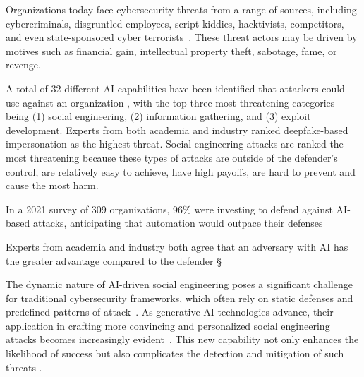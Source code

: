 






%
%
Organizations today face cybersecurity threats from a range of sources, including cybercriminals, disgruntled employees, script kiddies, hacktivists, competitors, and even state-sponsored cyber terrorists~\citep{mirsky_Threat_Offensive_AI_Organizations_2023}. These threat actors may be driven by motives such as financial gain, intellectual property theft, sabotage, fame, or revenge.








%
%
A total of 32 different AI capabilities have been identified that attackers could use against an organization \citep{mirsky_Threat_Offensive_AI_Organizations_2023}, with the top three most threatening categories being (1) social engineering, (2) information gathering, and (3) exploit development. Experts from both academia and industry ranked deepfake-based impersonation as the highest threat. Social engineering attacks are ranked the most threatening because these types of attacks are outside of the defender's control, are relatively easy to achieve, have high payoffs, are hard to prevent and cause the most harm.

In a 2021 survey of 309 organizations, 96\% were investing to defend against AI-based attacks, anticipating that automation would outpace their defenses \citep{NULL}

Experts from academia and industry both agree that an adversary with AI has the greater advantage compared to the defender \citep{mirsky_Threat_Offensive_AI_Organizations_2023}§



The dynamic nature of AI-driven social engineering poses a significant challenge for traditional cybersecurity frameworks, which often rely on static defenses and predefined patterns of attack~\citep{NULL}. As generative AI technologies advance, their application in crafting more convincing and personalized social engineering attacks becomes increasingly evident~\citep{blauth_AI_Crime_Overview_Malicious_Use_Abuse_2022}. This new capability not only enhances the likelihood of success but also complicates the detection and mitigation of such threats \citep{mirsky_Threat_Offensive_AI_Organizations_2023}.



